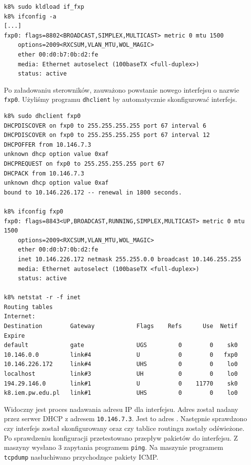 \begin{lstlisting}
k8% sudo kldload if_fxp
k8% ifconfig -a
[...]
fxp0: flags=8802<BROADCAST,SIMPLEX,MULTICAST> metric 0 mtu 1500
    options=2009<RXCSUM,VLAN_MTU,WOL_MAGIC>
    ether 00:d0:b7:0b:d2:fe
    media: Ethernet autoselect (100baseTX <full-duplex>)
    status: active
\end{lstlisting}

Po załadowaniu sterowników, zauważono powstanie nowego interfejsu o nazwie
\texttt{fxp0}. Użyliśmy programu \texttt{dhclient} by automatycznie
skonfigurować interfejs.

\begin{lstlisting}
k8% sudo dhclient fxp0
DHCPDISCOVER on fxp0 to 255.255.255.255 port 67 interval 6
DHCPDISCOVER on fxp0 to 255.255.255.255 port 67 interval 12
DHCPOFFER from 10.146.7.3
unknown dhcp option value 0xaf
DHCPREQUEST on fxp0 to 255.255.255.255 port 67
DHCPACK from 10.146.7.3
unknown dhcp option value 0xaf
bound to 10.146.226.172 -- renewal in 1800 seconds.

k8% ifconfig fxp0
fxp0: flags=8843<UP,BROADCAST,RUNNING,SIMPLEX,MULTICAST> metric 0 mtu 1500
    options=2009<RXCSUM,VLAN_MTU,WOL_MAGIC>
    ether 00:d0:b7:0b:d2:fe
    inet 10.146.226.172 netmask 255.255.0.0 broadcast 10.146.255.255
    media: Ethernet autoselect (100baseTX <full-duplex>)
    status: active

k8% netstat -r -f inet
Routing tables
Internet:
Destination        Gateway            Flags    Refs      Use  Netif Expire
default            gate               UGS         0        0    sk0
10.146.0.0         link#4             U           0        0   fxp0
10.146.226.172     link#4             UHS         0        0    lo0
localhost          link#3             UH          0        0    lo0
194.29.146.0       link#1             U           0    11770    sk0
k8.iem.pw.edu.pl   link#1             UHS         0        0    lo0
\end{lstlisting}

Widoczny jest proces nadawania adresu IP dla interfejsu. Adres został nadany
przez serwer DHCP z adresem \texttt{10.146.7.3}. Jest to adres \volt. Następnie
sprawdzono czy interfejs został skonfigurowany oraz czy tablice routingu zostały
odświeżone. Po sprawdzeniu konfiguracji przetestowano przepływ pakietów do
interfejsu. Z maszyny \volt{} wysłano 3 zapytania programem \texttt{ping}. Na
maszynie \kosiem{} programem \texttt{tcpdump} nasłuchiwano przychodzące pakiety
ICMP.

